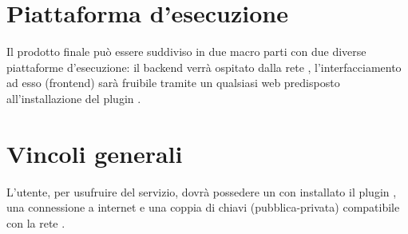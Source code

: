 \documentclass[AnalisiDeiRequisiti.tex]{subfiles}
\begin{document}
\section{Piattaforma d'esecuzione}
Il prodotto finale può essere suddiviso in due macro parti con due diverse piattaforme d'esecuzione: il backend verrà ospitato dalla rete , l'interfacciamento ad esso (frontend) sarà fruibile tramite un qualsiasi  web predisposto all'installazione del plugin .

\section{Vincoli generali}
L'utente, per usufruire del servizio, dovrà possedere un  con installato il plugin , una connessione a internet e una coppia di chiavi (pubblica-privata) compatibile con la rete .	
\end{document}

